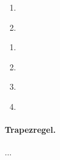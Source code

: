 \documentclass[12pt]{scrreprt}
\begin{document}
\begin{satz}
  \label{satz:int.maj-krit}

  \begin{enumerate}
    \item \label{satz:int.maj-krit.a}
    \item \label{satz:int.maj-krit.b}
  \end{enumerate}
\end{satz}

\begin{bsp}
  \label{bsp:int.maj-krit}

  \begin{enumerate}
    \item \label{bsp:int.maj-krit.a}
    \item \label{bsp:int.maj-krit.b}
    \item \label{bsp:int.maj-krit.c}
    \item \label{bsp:int.maj-krit.d}
  \end{enumerate}
\end{bsp}

\begin{bsp}
  \label{bsp:int.zus-reihen}

\end{bsp}

\begin{bsp}
  \label{bsp:int.gammafkt}

\end{bsp}


\paragraph{Trapezregel.} ...
\end{document}
